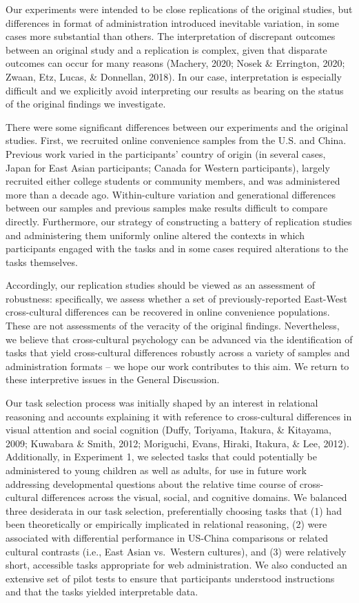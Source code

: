 \documentclass[
  man,floatsintext]{apa6}
\begin{document}
Our experiments were intended to be close replications of the original studies, but differences in format of administration introduced inevitable variation, in some cases more substantial than others. The interpretation of discrepant outcomes between an original study and a replication is complex, given that disparate outcomes can occur for many reasons (Machery, 2020; Nosek \& Errington, 2020; Zwaan, Etz, Lucas, \& Donnellan, 2018). In our case, interpretation is especially difficult and we explicitly avoid interpreting our results as bearing on the status of the original findings we investigate.

There were some significant differences between our experiments and the original studies. First, we recruited online convenience samples from the U.S. and China. Previous work varied in the participants' country of origin (in several cases, Japan for East Asian participants; Canada for Western participants), largely recruited either college students or community members, and was administered more than a decade ago. Within-culture variation and generational differences between our samples and previous samples make results difficult to compare directly. Furthermore, our strategy of constructing a battery of replication studies and administering them uniformly online altered the contexts in which participants engaged with the tasks and in some cases required alterations to the tasks themselves.

Accordingly, our replication studies should be viewed as an assessment of robustness: specifically, we assess whether a set of previously-reported East-West cross-cultural differences can be recovered in online convenience populations. These are not assessments of the veracity of the original findings. Nevertheless, we believe that cross-cultural psychology can be advanced via the identification of tasks that yield cross-cultural differences robustly across a variety of samples and administration formats -- we hope our work contributes to this aim. We return to these interpretive issues in the General Discussion.

Our task selection process was initially shaped by an interest in relational reasoning and accounts explaining it with reference to cross-cultural differences in visual attention and social cognition (Duffy, Toriyama, Itakura, \& Kitayama, 2009; Kuwabara \& Smith, 2012; Moriguchi, Evans, Hiraki, Itakura, \& Lee, 2012). Additionally, in Experiment 1, we selected tasks that could potentially be administered to young children as well as adults, for use in future work addressing developmental questions about the relative time course of cross-cultural differences across the visual, social, and cognitive domains. We balanced three desiderata in our task selection, preferentially choosing tasks that (1) had been theoretically or empirically implicated in relational reasoning, (2) were associated with differential performance in US-China comparisons or related cultural contrasts (i.e., East Asian vs.~Western cultures), and (3) were relatively short, accessible tasks appropriate for web administration. We also conducted an extensive set of pilot tests to ensure that participants understood instructions and that the tasks yielded interpretable data.
\end{document}
